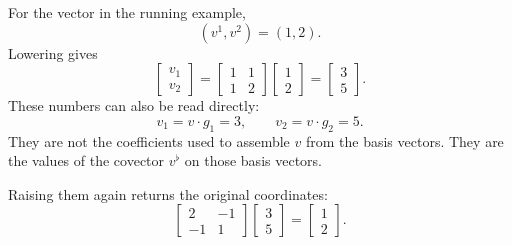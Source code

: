 For the vector in the running example,
\[
  (v^1,v^2)=(1,2).
\]
Lowering gives
\[
  \begin{bmatrix}v_1\\v_2\end{bmatrix}
  =
  \begin{bmatrix}
    1&1\\
    1&2
  \end{bmatrix}
  \begin{bmatrix}1\\2\end{bmatrix}
  =
  \begin{bmatrix}3\\5\end{bmatrix}.
\]
These numbers can also be read directly:
\[
  v_1=v\cdot g_1=3,
  \qquad
  v_2=v\cdot g_2=5.
\]
They are not the coefficients used to assemble \(v\) from the basis vectors.  They are the values of the covector \(v^\flat\) on those basis vectors.

Raising them again returns the original coordinates:
\[
  \begin{bmatrix}
    2&-1\\
    -1&1
  \end{bmatrix}
  \begin{bmatrix}3\\5\end{bmatrix}
  =
  \begin{bmatrix}1\\2\end{bmatrix}.
\]

